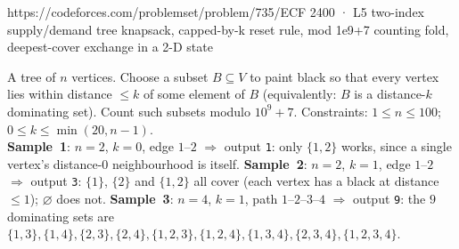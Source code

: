   {https://codeforces.com/problemset/problem/735/E}{CF 2400 · L5}
  {two-index supply/demand tree knapsack, capped-by-k reset rule, mod 1e9+7 counting fold, deepest-cover exchange in a 2-D state}

\begin{problemstatement}
A tree of $n$ vertices. Choose a subset $B \subseteq V$ to paint black so
that every vertex lies within distance $\le k$ of some element of $B$
(equivalently: $B$ is a distance-$k$ dominating set). Count such subsets
modulo $10^9+7$. Constraints: $1 \le n \le 100$; $0 \le k \le
\min(20, n-1)$.\\
\textbf{Sample~1}: $n = 2$, $k = 0$, edge $1$--$2$ $\Rightarrow$ output
\texttt{1}: only $\{1,2\}$ works, since a single vertex's distance-$0$
neighbourhood is itself. \textbf{Sample~2}: $n = 2$, $k = 1$, edge
$1$--$2$ $\Rightarrow$ output \texttt{3}: $\{1\}$, $\{2\}$ and $\{1,2\}$
all cover (each vertex has a black at distance $\le 1$); $\varnothing$
does not. \textbf{Sample~3}: $n = 4$, $k = 1$, path $1$--$2$--$3$--$4$
$\Rightarrow$ output \texttt{9}: the $9$ dominating sets are
$\{1,3\}, \{1,4\}, \{2,3\}, \{2,4\}, \{1,2,3\}, \{1,2,4\}, \{1,3,4\},
\{2,3,4\}, \{1,2,3,4\}$.
\end{problemstatement}

